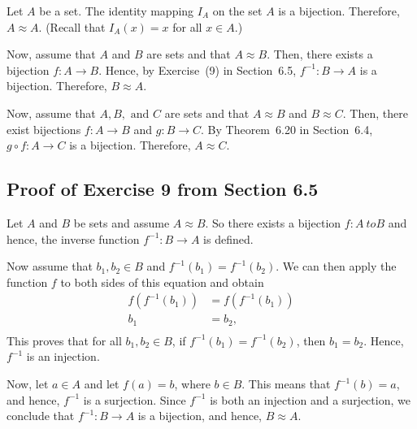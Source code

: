 \documentclass[11pt]{article}
\begin{document}
\begin{myproof}
Let $A$ be a set.  The identity mapping $I_A$ on the set $A$ is a bijection.  Therefore, $A \approx A$.   (Recall that $I_A \left( x \right) = x$ for all $x \in A$.)

\newpar
Now, assume that $A$ and $B$ are sets and that $A \approx B$.  Then, there exists a bijection $f:A \to B$.  Hence, by Exercise~(9) in Section~6.5, 
$f^{-1}:B \to A$ is a bijection.  Therefore, $B \approx A$.

\newpar
Now, assume that $A, B, \text{ and }C$ are sets and that $A \approx B$ and 
$B \approx C$.  Then, there exist bijections $f:A \to B$ and $g:B \to C$.  By Theorem~6.20 in Section~6.4, 
$g \circ f:A \to C$ is a bijection.  Therefore, $A \approx C$.

\hbreak
\end{myproof}
\renewcommand{\theenumi}{\textbf{\arabic{enumi}}}

\subsection*{Proof of Exercise 9 from Section 6.5}
\begin{myproof}
Let $A$ and $B$ be sets and assume $A \approx B$.  So there exists a bijection $f:A \ to B$ and hence, the inverse function $f^{-1}:B \to A$ is defined.

Now assume that $b_1, b_2 \in B$ and $f^{-1} \left( b_1 \right) = f^{-1} \left( b_2 \right)$.  We can then apply the function $f$ to both sides of this equation and obtain
\begin{align*}
f \left( f^{-1} \left( b_1 \right) \right) &= f \left( f^{-1} \left( b_1 \right) \right) \\
                                       b_1 &= b_2, \\
\end{align*}
This proves that for all $b_1, b_2 \in B$, if $f^{-1} \left( b_1 \right) = f^{-1} \left( b_2 \right)$, then $b_1 = b_2$.  Hence, $f^{-1}$ is an injection.  

Now, let $a \in A$ and let $f \left( a \right) = b$, where $b \in B$.   This means that $f^{-1}(b) = a$, and hence, $f^{-1}$ is a surjection.  Since $f^{-1}$ is both an injection and a surjection, we conclude that $f^{-1}: B \to A$ is a bijection, and hence, $B \approx A$.
\end{myproof}
\end{document}
